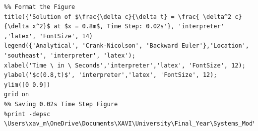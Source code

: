 \documentclass[11pt]{article}
\begin{document}
\begin{appendices}
\begin{lstlisting}
%% Format the Figure
title({'Solution of $\frac{\delta c}{\delta t} = \frac{ \delta^2 c}{\delta x^2}$ at $x = 0.8m$, Time Step: 0.02s'}, 'interpreter' ,'latex', 'FontSize', 14)
legend({'Analytical', 'Crank-Nicolson', 'Backward Euler'},'Location', 'southeast', 'interpreter', 'latex');
xlabel('Time \ in \ Seconds','interpreter','latex', 'FontSize', 12);
ylabel('$c(0.8,t)$', 'interpreter','latex', 'FontSize', 12);
ylim([0 0.9])
grid on
%% Saving 0.02s Time Step Figure
%print -depsc \Users\xav_m\OneDrive\Documents\XAVI\University\Final_Year\Systems_Mod\Modeling_CW2\Report\Figures\epsQ1bdt025


\end{lstlisting}


\pagebreak

\end{appendices}
\end{document}
